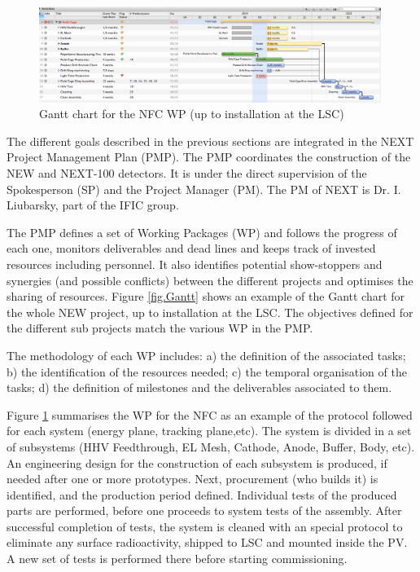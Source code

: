 \begin{figure}[h!]
\begin{center}
\includegraphics[width=0.99\textwidth]{img/Merlin_FC.png}
\end{center}
\caption{\label{Fig:NFC} Gantt chart for the NFC WP (up to installation at the LSC)}
\end{figure}

The different goals described in the previous sections are integrated in the NEXT Project Management Plan (PMP). 
The PMP coordinates the construction of the NEW and NEXT-100 detectors. It is under the direct supervision of the Spokesperson (SP) and the Project Manager (PM). The PM of NEXT is Dr. I. Liubarsky, part of the IFIC group.

The PMP defines a set of Working Packages (WP) and follows the progress of each one, monitors deliverables and dead lines and keeps track of invested resources including personnel. It also identifies potential show-stoppers and synergies (and possible conflicts) between the different projects and optimises the sharing of resources. Figure \ref{fig.Gantt} shows an example of the Gantt chart for the whole NEW project, up to installation at the LSC. 
The objectives defined for the different sub projects match the various WP in the PMP. 

The methodology of each WP includes: a) the definition of the associated tasks; b) the identification of the resources needed; c) the temporal organisation of the tasks; d) the definition of milestones and the deliverables associated to them. 

Figure \ref{Fig:NFC} summarises the WP for the NFC as an example of the protocol followed for each system (energy plane, tracking plane,etc). The system is divided in a set of subsystems (HHV Feedthrough, EL Mesh, Cathode, Anode, Buffer, Body, etc). An engineering design for the construction of each subsystem is produced, if needed after one or more prototypes. Next, procurement (who builds it) is identified, and the production period defined. Individual tests of the produced parts are performed, before one proceeds to system tests of the assembly. After successful completion of tests, the system is cleaned with an special protocol to eliminate any surface radioactivity, shipped to LSC and mounted inside the PV. A new set of tests is performed there before starting commissioning. 

